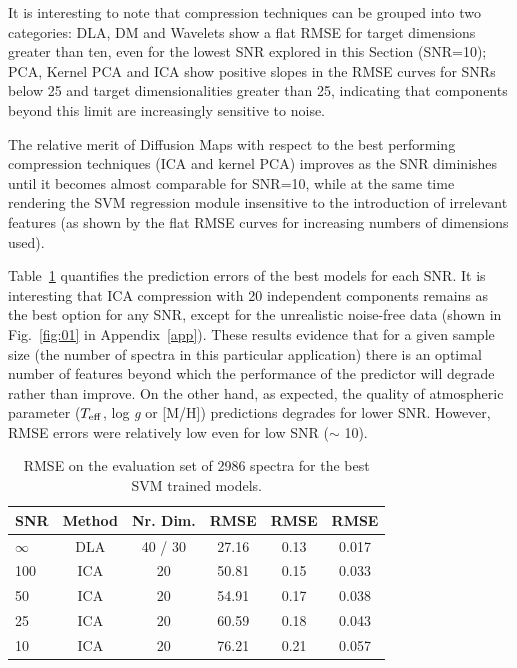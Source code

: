 \documentclass[a4paper,fleqn,usenatbib]{mnras}
\begin{document}
{{{It is interesting to note that compression techniques can be grouped
into two categories: DLA, DM and Wavelets show a flat RMSE for target
dimensions greater than ten, even for the lowest SNR explored in this
Section (SNR=10); PCA, Kernel PCA and ICA show positive slopes in the
RMSE curves for SNRs below 25 and target dimensionalities greater than
25, indicating that components beyond this limit are increasingly
sensitive to noise. 

The relative merit of Diffusion Maps with respect to the best
performing compression techniques (ICA and kernel PCA) improves as the
SNR diminishes until it becomes almost comparable for SNR=10, while at
the same time rendering the SVM regression module insensitive to the
introduction of irrelevant features (as shown by the flat RMSE curves
for increasing numbers of dimensions used). 

Table~\ref{tab:01} quantifies the prediction errors of the best models
for each SNR. It is interesting that ICA compression with 20
independent components remains as the best option for any SNR, except
for the unrealistic noise-free data (shown in Fig.~\ref{fig:01} in
Appendix~\ref{app}). These results evidence that for a given sample
size (the number of spectra in this particular application) there is
an optimal number of features beyond which the performance of the
predictor will degrade rather than improve.  On the other hand, as
expected, the quality of atmospheric parameter ($T_{\rm eff}$, log
\textit{g} or [M/H]) predictions degrades for lower SNR. However, RMSE
errors were relatively low even for low SNR ($\sim$ 10).  

\begin{table}
\centering
\caption{RMSE on the evaluation set of 2986 spectra for the best SVM trained models.}
\label{tab:01}
\begin{tabular}{l c c c c c}
\hline
\textbf{SNR} & \textbf{Method} & \textbf{Nr. Dim.} & {\bf RMSE} & {\bf RMSE} & {\bf RMSE}\\
\hline
$\infty$ & DLA & 40 / 30\protect\footnotemark & 27.16 & 0.13 & 0.017\\
100 & ICA & 20 & 50.81 & 0.15 & 0.033\\
50 & ICA & 20 & 54.91 & 0.17 & 0.038\\
25 & ICA & 20 & 60.59 & 0.18 & 0.043\\
10 & ICA & 20 & 76.21 & 0.21 & 0.057\\
\hline
\end{tabular}
\end{table}

}}}
\end{document}

